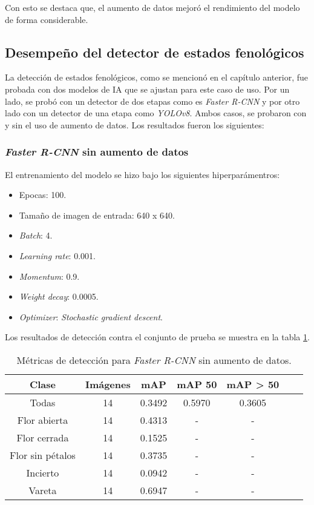 Con esto se destaca que, el aumento de datos mejoró el rendimiento del modelo de forma considerable.

\subsection{Desempeño del detector de estados fenológicos}

La detección de estados fenológicos, como se mencionó en el capítulo anterior, fue probada con dos modelos de IA que se ajustan para este caso de uso. Por un lado, se probó con un detector de dos etapas como es \textit{Faster R-CNN} y por otro lado con un detector de una etapa como \textit{YOLOv8}. Ambos casos, se probaron con y sin el uso de aumento de datos. Los resultados fueron los siguientes:

\subsubsection{\textit{Faster R-CNN} sin aumento de datos}

El entrenamiento del modelo se hizo bajo los siguientes hiperparámentros:

\begin{itemize}
	\item Epocas: 100.
    \item Tamaño de imagen de entrada: 640 x 640.
    \item \textit{Batch}: 4.
    \item \textit{Learning rate}: 0.001.
    \item \textit{Momentum}: 0.9.
    \item \textit{Weight decay}: 0.0005.
    \item \textit{Optimizer}: \textit{Stochastic gradient descent}.
\end{itemize}

Los resultados de detección contra el conjunto de prueba se muestra en la tabla \ref{tab:resultadosFasterSinAug}.

\begin{table}[h]
	\centering
	\caption{Métricas de detección para \textit{Faster R-CNN} sin aumento de datos.}
	\begin{tabular}{c c c c c c c}    
		\toprule
		\textbf{Clase}&\textbf{Imágenes}&\textbf{mAP}&\textbf{mAP 50}&\textbf{mAP > 50}\\
		\midrule
		Todas & 14 & 0.3492 & 0.5970 & 0.3605\\
		Flor abierta & 14 & 0.4313 & - & - \\
		Flor cerrada & 14 & 0.1525 & - & - \\
		Flor sin pétalos & 14 & 0.3735 & - & - \\
		Incierto & 14 & 0.0942 & - & - \\
		Vareta & 14 & 0.6947 & - & - \\		
		\bottomrule
		\hline
	\end{tabular}
	\label{tab:resultadosFasterSinAug}
\end{table}

